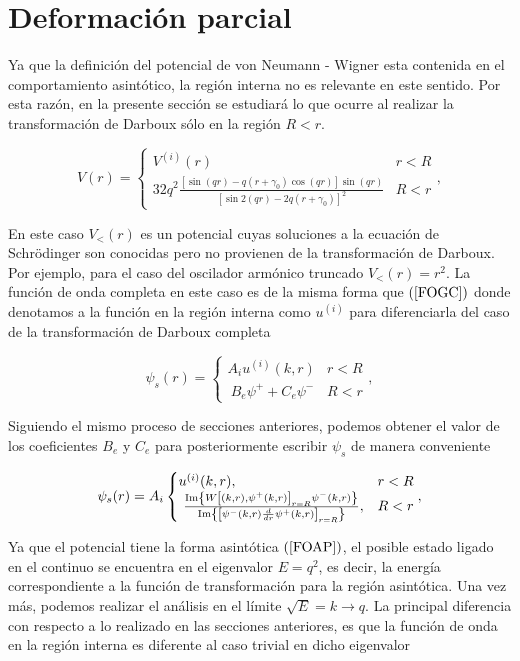 \section{Deformación parcial}
Ya que la definición del potencial de von Neumann - Wigner esta contenida en el comportamiento asintótico, la región interna no es relevante en este sentido. Por esta razón, en la presente sección se estudiará lo que ocurre al realizar la transformación de Darboux sólo en la región $R < r$. 

\begin{equation*}
	V(r) =
	\begin{cases}
		V^{(i)}(r) & r < R
		\\
		32q^2\frac{[\sin{(qr)}-q(r+\gamma_0)\cos{(qr)}]\sin{(qr)}}{[\sin{2(qr)}-2q(r+\gamma_0)]^2} & R < r
	\end{cases},
\end{equation*}

En este caso $V_< (r)$ es un potencial cuyas soluciones a la ecuación de Schrödinger son conocidas pero no provienen de la transformación de Darboux. Por ejemplo, para  el caso del oscilador armónico truncado $V_< (r) = r^2$. La función de onda completa en este caso es de la misma forma que $(\ref{FOGC})$ donde denotamos a la función en la región interna como $u^{(i)}$ para diferenciarla del caso de la transformación de Darboux completa

\begin{equation}
\psi_s(r)=\begin{cases}
A_i u^{(i)}(k,r) & r < R
\\\ B_e \psi^{+} + C_e \psi^{-} & R < r
\end{cases},\label{FOGCP}
\end{equation}

Siguiendo el mismo proceso de secciones anteriores, podemos obtener el valor de los coeficientes $B_e$ y $C_e$ para posteriormente escribir $\psi_s$ de manera conveniente


\begin{equation}
\psi_s(r)=A_i \begin{cases}
 u^{(i)}(k,r), & r < R
\\\ \frac{{\rm Im}\left\{W\left[ (k,r), \psi^{+}(k,r)\right]_{r=R}\psi^{-}(k,r)\right\}}{{\rm Im}\left\{\left[\psi^{-}(k,r)\frac{d}{dr}\psi^{+}(k,r)\right]_{r=R}\right\}},&R<r
\end{cases},\label{FOGCP}
\end{equation} 

Ya que el potencial tiene la forma asintótica $(\ref{FOAP})$, el posible estado ligado en el continuo se encuentra en el eigenvalor $E = q^2$, es decir, la energía correspondiente a la función de transformación para la región asintótica. Una vez más, podemos realizar el análisis en el límite $\sqrt{E} = k \to q$. La principal diferencia con respecto a lo realizado en las secciones anteriores, es que la función de onda en la región interna es diferente al caso trivial en dicho eigenvalor

